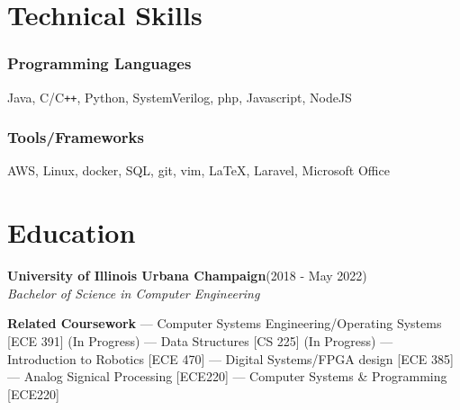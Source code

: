 \documentclass[letterpaper,12pt]{article}
\begin{document}
\section{Technical Skills}
    \subsubsection{Programming Languages}
    Java, C/C\verb!++!, Python, SystemVerilog, php, Javascript, NodeJS
    \vspace*{-4mm}
    \subsubsection{Tools/Frameworks}
    AWS, Linux, docker, SQL, git, vim, \LaTeX, Laravel, Microsoft Office
    \vspace*{-4mm}
\section{Education}
    {\large\textbf{University of Illinois Urbana Champaign}}\null\hfill (2018 - May 2022)\\
    \emph{Bachelor of Science in Computer Engineering}\null\hfill 
    \begin{center}
        \textbf{Related Coursework} --- Computer Systems Engineering/Operating Systems [ECE 391] (In Progress) --- Data Structures [CS 225] (In Progress) --- Introduction to Robotics [ECE 470] --- Digital Systems/FPGA design [ECE 385] --- Analog Signical Processing [ECE220] --- Computer Systems \& Programming [ECE220]
    \end{center}
\end{document}

